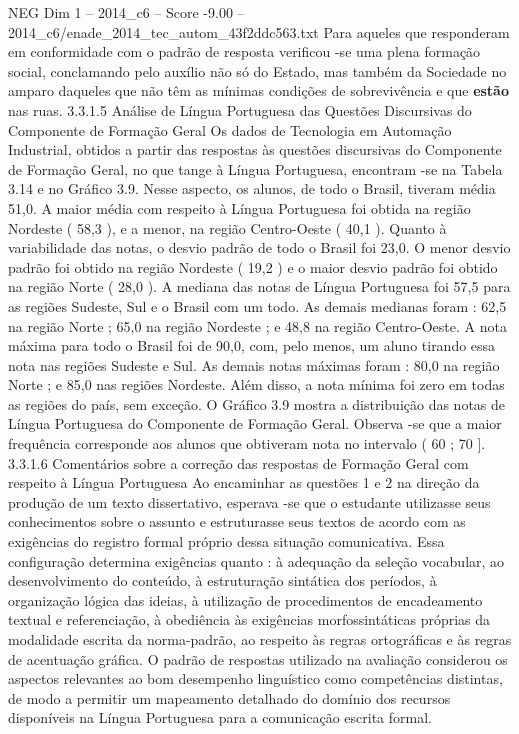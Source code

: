 \begin{textsample}{NEG Dim 1 – 2014\_c6 – Score -9.00 – 2014\_c6/enade\_2014\_tec\_autom\_43f2ddc563.txt}
Para aqueles que responderam em conformidade com o padrão de resposta verificou -se uma plena formação social, conclamando pelo auxílio não só do Estado, mas também da Sociedade no amparo daqueles que não têm as mínimas condições de sobrevivência e que \textbf{estão} nas ruas. 3.3.1.5 Análise de Língua Portuguesa das Questões Discursivas do Componente de Formação Geral Os dados de Tecnologia em Automação Industrial, obtidos a partir das respostas às questões discursivas do Componente de Formação Geral, no que tange à Língua Portuguesa, encontram -se na Tabela 3.14 e no Gráfico 3.9.
Nesse aspecto, os alunos, de todo o Brasil, tiveram média 51,0.
A maior média com respeito à Língua Portuguesa foi obtida na região Nordeste ( 58,3 ), e a menor, na região Centro-Oeste ( 40,1 ).
Quanto à variabilidade das notas, o desvio padrão de todo o Brasil foi 23,0.
O menor desvio padrão foi obtido na região Nordeste ( 19,2 ) e o maior desvio padrão foi obtido na região Norte ( 28,0 ).
A mediana das notas de Língua Portuguesa foi 57,5 para as regiões Sudeste, Sul e o Brasil com um todo.
As demais medianas foram : 62,5 na região Norte ; 65,0 na região Nordeste ; e 48,8 na região Centro-Oeste.
A nota máxima para todo o Brasil foi de 90,0, com, pelo menos, um aluno tirando essa nota nas regiões Sudeste e Sul.
As demais notas máximas foram : 80,0 na região Norte ; e 85,0 nas regiões Nordeste.
Além disso, a nota mínima foi zero em todas as regiões do país, sem exceção.
O Gráfico 3.9 mostra a distribuição das notas de Língua Portuguesa do Componente de Formação Geral.
Observa -se que a maior frequência corresponde aos alunos que obtiveram nota no intervalo ( 60 ; 70 ]. 3.3.1.6 Comentários sobre a correção das respostas de Formação Geral com respeito à Língua Portuguesa Ao encaminhar as questões 1 e 2 na direção da produção de um texto dissertativo, esperava -se que o estudante utilizasse seus conhecimentos sobre o assunto e estruturasse seus textos de acordo com as exigências do registro formal próprio dessa situação comunicativa.
Essa configuração determina exigências quanto : à adequação da seleção vocabular, ao desenvolvimento do conteúdo, à estruturação sintática dos períodos, à organização lógica das ideias, à utilização de procedimentos de encadeamento textual e referenciação, à obediência às exigências morfossintáticas próprias da modalidade escrita da norma-padrão, ao respeito às regras ortográficas e às regras de acentuação gráfica.
O padrão de respostas utilizado na avaliação considerou os aspectos relevantes ao bom desempenho linguístico como competências distintas, de modo a permitir um mapeamento detalhado do domínio dos recursos disponíveis na Língua Portuguesa para a comunicação escrita formal.

\end{textsample}
